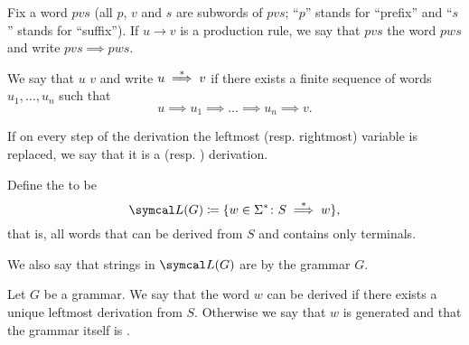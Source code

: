 \begin{definition}\label{def:grammar_derivation}
  Fix a word \( pvs \) (all \( p \), \( v \) and \( s \) are subwords of \( pvs \); \enquote{\( p \)} stands for \enquote{prefix} and \enquote{\( s \)} stands for \enquote{suffix}). If \( u \to v \) is a production rule, we say that \( pvs \)  the word \( pws \) and write \( pvs \implies pws \).

  We say that \( u \)  \( v \) and write \( u \overset * \implies v \) if there exists a finite sequence of words \( u_1, \ldots, u_n \) such that
  \begin{equation*}
    u \implies u_1 \implies \ldots \implies u_n \implies v.
  \end{equation*}

  If on every step of the derivation the leftmost (resp. rightmost) variable is replaced, we say that it is a  (resp. ) derivation.

  Define the  to be
  \begin{equation*}
    \Cal{L}(G) \coloneqq \{ w \in \Sigma^* \colon S \Derives w \},
  \end{equation*}
  that is, all words that can be derived from \( S \) and contains only terminals.

  We also say that strings in \( \Cal{L}(G) \) are  by the grammar \( G \).
\end{definition}

\begin{definition}\label{def:ambiguous_grammar}
  Let \( G \) be a grammar. We say that the word \( w \) can be derived  if there exists a unique leftmost derivation from \( S \). Otherwise we say that \( w \) is generated  and that the grammar itself is .
\end{definition}


